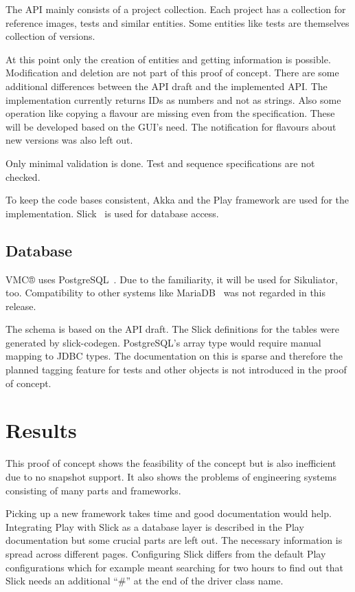 \documentclass[a4paper,twocolumn,twoside]{article}
\newcommand{\VMC}[0]{VMC®}
\newcommand{\Sik}[0]{Sikuliator}
\begin{document}
The API mainly consists of a project collection.
Each project has a collection for reference images, tests and similar entities.
Some entities like tests are themselves collection of versions.

At this point only the creation of entities and getting information is possible.
Modification and deletion are not part of this proof of concept.
There are some additional differences between the API draft and the implemented API.
The implementation currently returns IDs as numbers and not as strings.
Also some operation like copying a flavour are missing even from the specification.
These will be developed based on the GUI's need.
The notification for flavours about new versions was also left out.

Only minimal validation is done.
Test and sequence specifications are not checked.

To keep the code bases consistent, Akka and the Play framework are used for the implementation.
Slick~\cite{Slick} is used for database access.

\subsection{Database}
\VMC{} uses PostgreSQL~\cite{PostgreSQL}.
Due to the familiarity, it will be used for \Sik{}, too.
Compatibility to other systems like MariaDB~\cite{MariaDB} was not regarded in this release.

The schema is based on the API draft.
The Slick definitions for the tables were generated by slick-codegen.
PostgreSQL's array type would require manual mapping to JDBC types.
The documentation on this is sparse and therefore the planned tagging feature for tests and other objects is not introduced in the proof of concept.


\section{Results}
This proof of concept shows the feasibility of the concept but is also inefficient due to no snapshot support.
It also shows the problems of engineering systems consisting of many parts and frameworks.

Picking up a new framework takes time and good documentation would help.
Integrating Play with Slick as a database layer is described in the Play documentation but some crucial parts are left out.
The necessary information is spread across different pages.
Configuring Slick differs from the default Play configurations which for example meant searching for two hours to find out that Slick needs an additional \enquote{\#} at the end of the driver class name.
\end{document}
